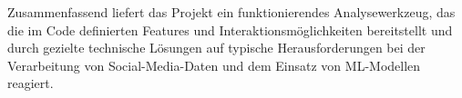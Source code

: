  
Zusammenfassend liefert das Projekt ein funktionierendes Analysewerkzeug, das die im Code definierten Features und Interaktionsmöglichkeiten bereitstellt und durch gezielte technische Lösungen auf typische Herausforderungen bei der Verarbeitung von Social-Media-Daten und dem Einsatz von ML-Modellen reagiert.
